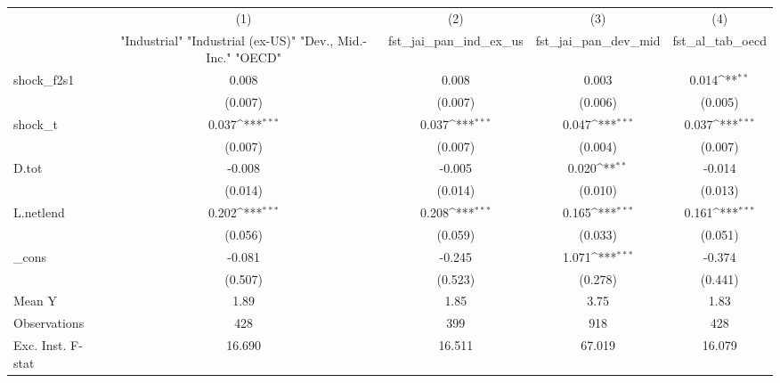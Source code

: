 {
\def\sym#1{\ifmmode^{#1}\else\(^{#1}\)\fi}
\begin{tabular}{l*{4}{c}}
\toprule
            &\multicolumn{1}{c}{(1)}&\multicolumn{1}{c}{(2)}&\multicolumn{1}{c}{(3)}&\multicolumn{1}{c}{(4)}\\
            &\multicolumn{1}{c}{ "Industrial" "Industrial (ex-US)" "Dev., Mid.-Inc." "OECD" }&\multicolumn{1}{c}{fst\_jai\_pan\_ind\_ex\_us}&\multicolumn{1}{c}{fst\_jai\_pan\_dev\_mid}&\multicolumn{1}{c}{fst\_al\_tab\_oecd}\\
\midrule
shock\_f2s1  &       0.008         &       0.008         &       0.003         &       0.014\sym{**} \\
            &     (0.007)         &     (0.007)         &     (0.006)         &     (0.005)         \\
\addlinespace
shock\_t     &       0.037\sym{***}&       0.037\sym{***}&       0.047\sym{***}&       0.037\sym{***}\\
            &     (0.007)         &     (0.007)         &     (0.004)         &     (0.007)         \\
\addlinespace
D.tot       &      -0.008         &      -0.005         &       0.020\sym{**} &      -0.014         \\
            &     (0.014)         &     (0.014)         &     (0.010)         &     (0.013)         \\
\addlinespace
L.netlend   &       0.202\sym{***}&       0.208\sym{***}&       0.165\sym{***}&       0.161\sym{***}\\
            &     (0.056)         &     (0.059)         &     (0.033)         &     (0.051)         \\
\addlinespace
\_cons      &      -0.081         &      -0.245         &       1.071\sym{***}&      -0.374         \\
            &     (0.507)         &     (0.523)         &     (0.278)         &     (0.441)         \\
\midrule
Mean Y      &        1.89         &        1.85         &        3.75         &        1.83         \\
Observations&         428         &         399         &         918         &         428         \\
Exc. Inst. F-stat&      16.690         &      16.511         &      67.019         &      16.079         \\
\bottomrule
\end{tabular}
}
